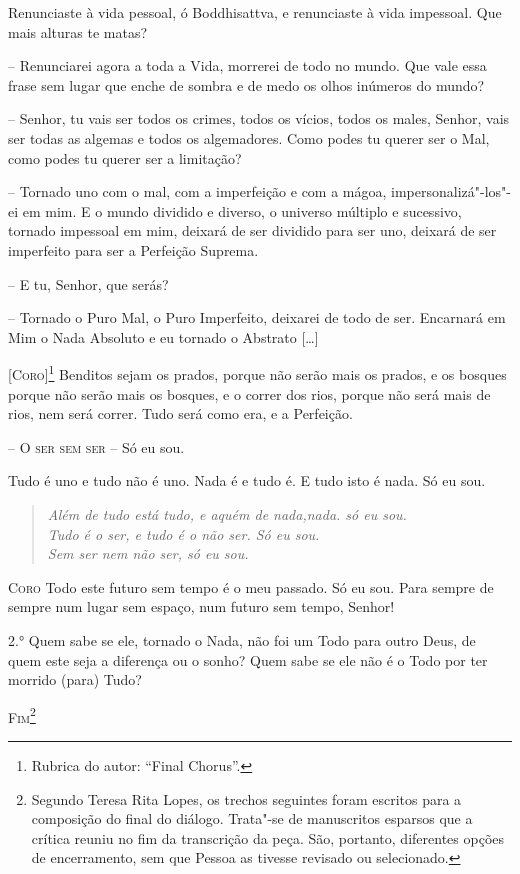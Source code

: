 Renunciaste à vida pessoal, ó Boddhisattva, e renunciaste à vida
impessoal. Que mais alturas te matas?

-- Renunciarei agora a toda a Vida, morrerei de todo no mundo. Que vale
essa frase sem lugar que enche de sombra e de medo os olhos inúmeros
do mundo?

-- Senhor, tu vais ser todos os crimes, todos os vícios, todos os
males, Senhor, vais ser todas as algemas e todos os algemadores. Como
podes tu querer ser o Mal, como podes tu querer ser a limitação?

-- Tornado uno com o mal, com a imperfeição e com a mágoa,
impersonalizá"-los"-ei em mim. E o mundo dividido e diverso, o universo
múltiplo e sucessivo, tornado impessoal em mim, deixará de ser
dividido para ser uno, deixará de ser imperfeito para ser a Perfeição
Suprema.

-- E tu, Senhor, que serás?

-- Tornado o Puro Mal, o Puro Imperfeito, deixarei de todo de ser.
Encarnará em Mim o Nada Absoluto e eu tornado o Abstrato [\ldots{}]

\textsc{[Coro]\footnote{ Rubrica do autor: ``Final Chorus''.}} Benditos sejam
os prados, porque não serão mais os prados, e os bosques porque não
serão mais os bosques, e o correr dos rios, porque não será mais de
rios, nem será correr. Tudo será como era, e a Perfeição.

-- \textsc{O ser sem ser} -- Só eu sou.

Tudo é uno e tudo não é uno. Nada é e tudo é. E tudo isto é nada. Só
eu sou.

\settowidth{\versewidth}{além de tudo está tudo, e aquém de nada, nada. só eu sou}
\begin{verse}
{\itshape 
Além de tudo está tudo, e aquém de nada,\qb{}nada. só eu sou.\\ 
Tudo é o ser, e tudo é o não ser. Só eu sou.\\
Sem ser nem não ser, só eu sou.}
\end{verse}

\textsc{Coro} Todo este futuro sem tempo é o meu passado. Só eu sou. Para
sempre de sempre num lugar sem espaço, num futuro sem tempo, Senhor!%

\textsc{2.°} Quem sabe se ele, tornado o Nada, não foi um Todo para outro
Deus, de quem este seja a diferença ou o sonho? Quem sabe se ele não
é o Todo por ter morrido (para) Tudo?

\bigskip

\begin{center}
\textsc{Fim}\footnote{ Segundo Teresa Rita Lopes, os trechos
seguintes foram escritos para a composição do final do diálogo.
Trata"-se de manuscritos esparsos que a crítica reuniu no fim da
transcrição da peça. São, portanto, diferentes opções de
encerramento, sem que Pessoa as tivesse revisado ou selecionado.}
\end{center}

